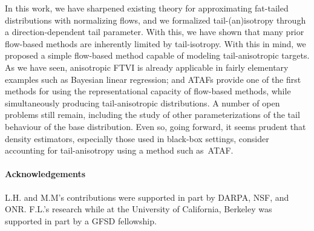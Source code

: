 \documentclass[nohyperref]{article}
\theoremstyle{plain}
\theoremstyle{definition}
\theoremstyle{remark}
\begin{document}
In this work, we have sharpened existing theory for approximating fat-tailed distributions with normalizing flows, and we formalized tail-(an)isotropy through a direction-dependent tail parameter. With this, we have shown that many prior flow-based methods are inherently limited by tail-isotropy. With this in mind, we proposed a simple flow-based method capable of modeling tail-anisotropic targets.
As we have seen, anisotropic FTVI is already applicable in fairly elementary examples such as Bayesian linear regression;
and ATAFs provide one of the first methods for using the representational capacity of flow-based methods,
while simultaneously producing tail-anisotropic distributions. A number of open problems still remain, including the study of other parameterizations of the tail behaviour of the base distribution. Even so, going forward, it seems prudent that density estimators, especially those used in black-box settings, consider accounting for tail-anisotropy using a method such as~ATAF.%


\paragraph{Acknowledgements}
L.H. and M.M's contributions were supported in part by DARPA, NSF, and ONR.
F.L.’s research while at the University of California, Berkeley was supported in part by a GFSD fellowship.





\end{document}
